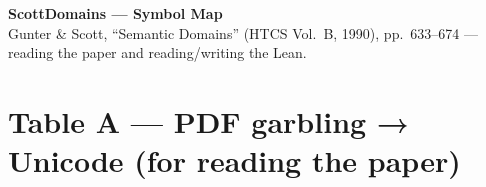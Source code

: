 \documentclass[10pt]{article}
\begin{document}
\begin{center}
  {\Large\bfseries ScottDomains — Symbol Map}\\[2pt]
  {\footnotesize Gunter \& Scott, ``Semantic Domains'' (HTCS Vol.~B, 1990),
   pp.~633–674 — reading the paper and reading/writing the Lean.}
\end{center}

\vspace{4pt}

\section*{Table A — PDF garbling → Unicode (for reading the paper)}
\end{document}
